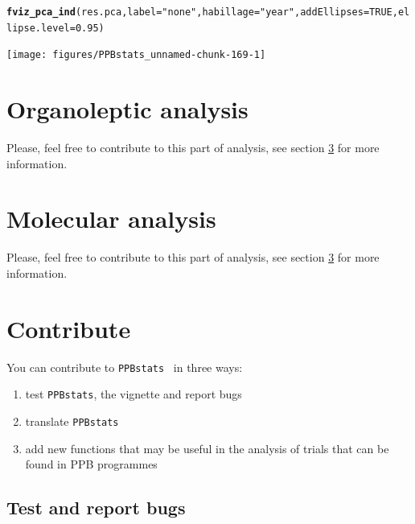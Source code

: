 \documentclass{book}\usepackage[]{graphicx}\usepackage[]{color}
\makeatletter
\newcommand{\hlnum}[1]{\textcolor[rgb]{0.686,0.059,0.569}{#1}}%
\newcommand{\hlstr}[1]{\textcolor[rgb]{0.192,0.494,0.8}{#1}}%
\newcommand{\hlstd}[1]{\textcolor[rgb]{0.345,0.345,0.345}{#1}}%
\newcommand{\hlkwc}[1]{\textcolor[rgb]{0.333,0.667,0.333}{#1}}%
\newcommand{\hlkwd}[1]{\textcolor[rgb]{0.737,0.353,0.396}{\textbf{#1}}}%
\newenvironment{kframe}{%
 \def\at@end@of@kframe{}%
 \ifinner\ifhmode%
  \def\at@end@of@kframe{\end{minipage}}%
  \begin{minipage}{\columnwidth}%
 \fi\fi%
 \def\FrameCommand##1{\hskip\@totalleftmargin \hskip-\fboxsep
 \colorbox{shadecolor}{##1}\hskip-\fboxsep
     \hskip-\linewidth \hskip-\@totalleftmargin \hskip\columnwidth}%
 \MakeFramed {\advance\hsize-\width
   \@totalleftmargin\z@ \linewidth\hsize
   \@setminipage}}%
 {\par\unskip\endMakeFramed%
 \at@end@of@kframe}
\newenvironment{knitrout}{}{} %
\newcommand{\pack}{\texttt{PPBstats}}
\makeatother
\begin{document}
\begin{knitrout}
\color{fgcolor}\begin{kframe}
\begin{alltt}
\hlkwd{fviz_pca_ind}\hlstd{(res.pca,} \hlkwc{label}\hlstd{=}\hlstr{"none"}\hlstd{,} \hlkwc{habillage}\hlstd{=}\hlstr{"year"}\hlstd{,} \hlkwc{addEllipses}\hlstd{=}\hlnum{TRUE}\hlstd{,} \hlkwc{ellipse.level}\hlstd{=}\hlnum{0.95}\hlstd{)}
\end{alltt}
\end{kframe}

{\centering \texttt{[image: figures/PPBstats\_unnamed-chunk-169-1]} 

}



\end{knitrout}

\newpage

\chapter{Organoleptic analysis}
\label{organoleptic}
Please, feel free to contribute to this part of analysis, see section \ref{contribute} for more information.

\chapter{Molecular analysis}
\label{molecular}
Please, feel free to contribute to this part of analysis, see section \ref{contribute} for more information.


\chapter{Contribute}
\label{contribute}

You can contribute to \pack~ in three ways:

\begin{enumerate}
\item test \pack, the vignette and report bugs
\item translate \pack
\item add new functions that may be useful in the analysis of trials that can be found in PPB programmes
\end{enumerate}

\section{Test and report bugs}
\end{document}
